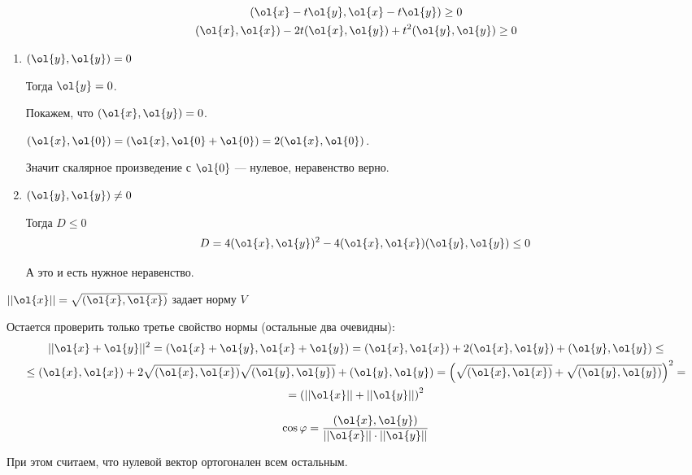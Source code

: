 \begin{gather*}
    (\ol{x} - t \ol{y}, \ol{x} - t \ol{y}) \geq 0
    \\
    (\ol{x}, \ol{x}) - 2t (\ol{x}, \ol{y}) + t^2 (\ol{y}, \ol{y}) \geq 0
\end{gather*}

\begin{enumerate}
    \item
        \( (\ol{y}, \ol{y}) = 0 \)

        Тогда \( \ol{y} = 0 \).

        Покажем, что \( (\ol{x}, \ol{y}) = 0 \).

        \( (\ol{x}, \ol{0}) = (\ol{x}, \ol{0} + \ol{0}) = 2 (\ol{x}, \ol{0}) \).

        Значит скалярное произведение с \( \ol{0} \) --- нулевое,
        неравенство верно.
    \item
        \( (\ol{y}, \ol{y}) \neq 0 \)

        Тогда \( D \leq 0 \)
        \[
            D = 4 (\ol{x}, \ol{y})^2 - 4(\ol{x}, \ol{x})(\ol{y}, \ol{y}) \leq 0
        \]

        А это и есть нужное неравенство.
\end{enumerate}

\newpage

\begin{thrm}{}{}
    \( || \ol{x} || = \sqrt{(\ol{x}, \ol{x})} \) задает норму \( V \)
\end{thrm}

Остается проверить только третье свойство нормы (остальные два очевидны):
\begin{gather*}
    || \ol{x} + \ol{y} ||^2 = (\ol{x} + \ol{y}, \ol{x} + \ol{y}) = (\ol{x}, \ol{x}) + 2(\ol{x}, \ol{y}) + (\ol{y}, \ol{y})
    \leq
    \\
    \leq
    (\ol{x}, \ol{x}) + 2 \sqrt{(\ol{x}, \ol{x})} \sqrt{(\ol{y}, \ol{y})} + (\ol{y}, \ol{y})
    =
    \left( \sqrt{(\ol{x}, \ol{x})} + \sqrt{(\ol{y}, \ol{y})} \right)^2
    =
    \\
    =
    \left( || \ol{x} || + || \ol{y} || \right)^2
\end{gather*}

\begin{defn}{}{}
    \[
        \cos \varphi = \frac{(\ol{x}, \ol{y})}{||\ol{x}|| \cdot ||\ol{y}||}
    \]

    При этом считаем, что нулевой вектор ортогонален всем остальным.
\end{defn}


